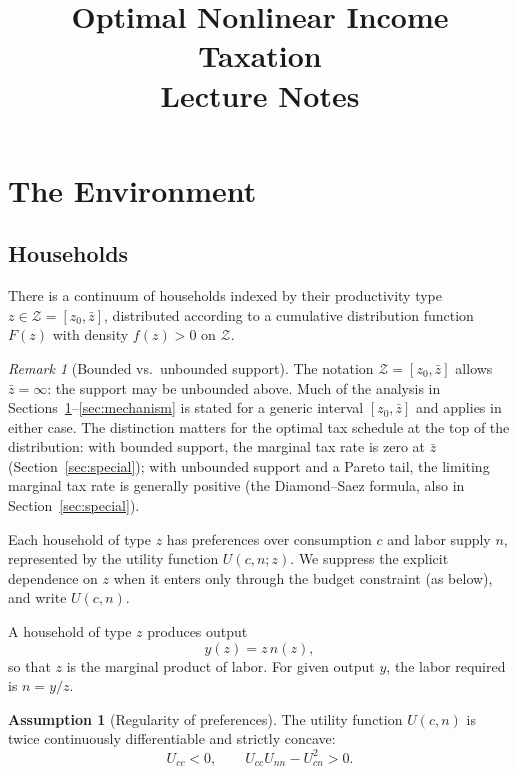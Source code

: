 \documentclass[12pt,a4paper]{article}
\title{\textbf{Optimal Nonlinear Income Taxation} \\ \large Lecture Notes}
\author{}
\date{}
\theoremstyle{definition}
\newtheorem{assumption}{Assumption}[section]
\theoremstyle{plain}
\theoremstyle{remark}
\newtheorem{remark}{Remark}[section]
\newcommand{\zbar}{\bar{z}}
\newcommand{\zlow}{z_{\scriptscriptstyle 0}}
\newcommand{\calZ}{\mathcal{Z}}
\begin{document}
\maketitle
\thispagestyle{fancy}

\tableofcontents
\newpage

\section{The Environment}
\label{sec:environment}

\subsection{Households}

There is a continuum of households indexed by their productivity type $z \in \calZ = [\zlow, \zbar]$, distributed according to a cumulative distribution function $F(z)$ with density $f(z) > 0$ on $\calZ$.

\begin{remark}[Bounded vs.\ unbounded support]
\label{rem:support}
The notation $\calZ = [\zlow, \zbar]$ allows $\zbar = \infty$: the support may be unbounded above. Much of the analysis in Sections~\ref{sec:environment}--\ref{sec:mechanism} is stated for a generic interval $[\zlow, \zbar]$ and applies in either case. The distinction matters for the optimal tax schedule at the top of the distribution: with bounded support, the marginal tax rate is zero at $\zbar$ (Section~\ref{sec:special}); with unbounded support and a Pareto tail, the limiting marginal tax rate is generally positive (the Diamond--Saez formula, also in Section~\ref{sec:special}).
\end{remark}

Each household of type $z$ has preferences over consumption $c$ and labor supply $n$, represented by the utility function $U(c, n; z)$. We suppress the explicit dependence on $z$ when it enters only through the budget constraint (as below), and write $U(c,n)$.

A household of type $z$ produces output
\[
  y(z) = z \, n(z),
\]
so that $z$ is the marginal product of labor. For given output $y$, the labor required is $n = y/z$.

\begin{assumption}[Regularity of preferences]
\label{as:concavity}
The utility function $U(c,n)$ is twice continuously differentiable and strictly concave:
\[
  U_{cc} < 0, \qquad U_{cc} U_{nn} - U_{cn}^2 > 0.
\]
\end{assumption}
\end{document}
